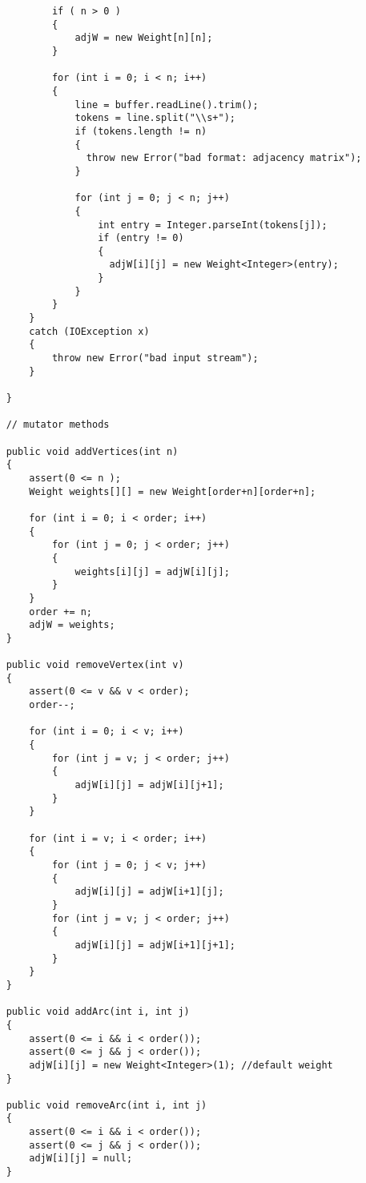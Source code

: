{\begin{verbatim}
            if ( n > 0 )
            {
                adjW = new Weight[n][n];
            }

            for (int i = 0; i < n; i++)
            {
                line = buffer.readLine().trim();
                tokens = line.split("\\s+");
                if (tokens.length != n)
                {
                  throw new Error("bad format: adjacency matrix");
                }

                for (int j = 0; j < n; j++)
                {
                    int entry = Integer.parseInt(tokens[j]);
                    if (entry != 0)
                    {
                      adjW[i][j] = new Weight<Integer>(entry);
                    }
                }
            }
        }
        catch (IOException x)
        {
            throw new Error("bad input stream");
        }

    }

    // mutator methods

    public void addVertices(int n)
    {
        assert(0 <= n );
        Weight weights[][] = new Weight[order+n][order+n];

        for (int i = 0; i < order; i++)
        {
            for (int j = 0; j < order; j++)
            {
	            weights[i][j] = adjW[i][j];
            }
        }
        order += n;
        adjW = weights;
    }

    public void removeVertex(int v)
    {
        assert(0 <= v && v < order);
        order--;

        for (int i = 0; i < v; i++)
        {
            for (int j = v; j < order; j++)
            {
                adjW[i][j] = adjW[i][j+1];
            }
        }

        for (int i = v; i < order; i++)
        {
            for (int j = 0; j < v; j++)
            {
                adjW[i][j] = adjW[i+1][j];
            }
            for (int j = v; j < order; j++)
            {
                adjW[i][j] = adjW[i+1][j+1];
            }
        }
    }

    public void addArc(int i, int j)
    {
        assert(0 <= i && i < order());
        assert(0 <= j && j < order());
        adjW[i][j] = new Weight<Integer>(1); //default weight
    }

    public void removeArc(int i, int j)
    {
        assert(0 <= i && i < order());
        assert(0 <= j && j < order());
        adjW[i][j] = null;
    }


\end{verbatim}}

